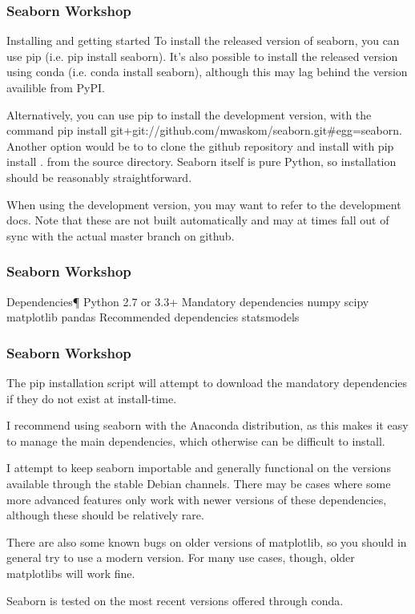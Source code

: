 
\begin{frame}
\frametitle{Seaborn Workshop}
\large
Installing and getting started
To install the released version of seaborn, you can use pip (i.e. pip install seaborn). It’s also possible to install the released version using conda (i.e. conda install seaborn), although this may lag behind the version availible from PyPI.

Alternatively, you can use pip to install the development version, with the command pip install git+git://github.com/mwaskom/seaborn.git#egg=seaborn. Another option would be to to clone the github repository and install with pip install . from the source directory. Seaborn itself is pure Python, so installation should be reasonably straightforward.

When using the development version, you may want to refer to the development docs. Note that these are not built automatically and may at times fall out of sync with the actual master branch on github.
\end{frame}
\begin{frame}
\frametitle{Seaborn Workshop}
\large

Dependencies¶
Python 2.7 or 3.3+
Mandatory dependencies
numpy
scipy
matplotlib
pandas
Recommended dependencies
statsmodels
\end{frame}
\begin{frame}
\frametitle{Seaborn Workshop}
\large

The pip installation script will attempt to download the mandatory dependencies if they do not exist at install-time.

I recommend using seaborn with the Anaconda distribution, as this makes it easy to manage the main dependencies, which otherwise can be difficult to install.

I attempt to keep seaborn importable and generally functional on the versions available through the stable Debian channels. There may be cases where some more advanced features only work with newer versions of these dependencies, although these should be relatively rare.

There are also some known bugs on older versions of matplotlib, so you should in general try to use a modern version. For many use cases, though, older matplotlibs will work fine.

Seaborn is tested on the most recent versions offered through conda.
\end{frame}
